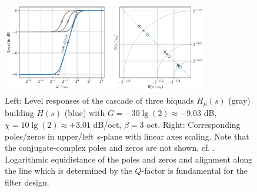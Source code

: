 \begin{figure}[t]
\centering
\includegraphics[width=0.8\textwidth]{../graphics/biquad-and-pzmap.pdf}
\caption{Left: Level responses of the cascade of three biquads $H_\mu(s)$
(gray) building $H(s)$ (blue)
with $G = - 30 \lg(2) \approx - 9.03$ dB, $\chi = 10 \lg(2) \approx +3.01$ dB/oct,
$\beta=3$ oct. Right: Corresponding poles/zeros in upper/left $s$-plane with
linear axes scaling. Note that the conjugate-complex poles and zeros are not
shown, cf. . Logarithmic equidistance of the poles and zeros
and alignment along the line which is determined by the $Q$-factor is fundamental for
the filter design.}
\label{fig:biquad-and-pzmap}
\end{figure}

%
